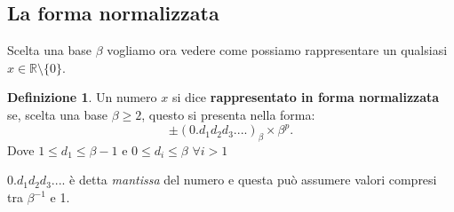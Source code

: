 \documentclass[12pt, a4paper]{book}
\theoremstyle{definition}
\newtheorem{defn}{Definizione}[section]
\begin{document}
\subsection{La forma normalizzata}
\begin{flushleft}
Scelta una base $\beta$ vogliamo ora vedere come possiamo rappresentare un qualsiasi $x \in \mathbb{R}  \setminus \{ 0 \}$.

\begin{defn}
Un numero $x$ si dice \textbf{rappresentato in forma normalizzata} se,  scelta una base $\beta \geq 2$,  questo si presenta nella forma: 
\[ \pm (0.d_{1}d_{2}d_{3}....)_{\beta} \times \beta^{p}. \]
Dove $ 1 \leq d_{1} \leq \beta - 1 $ e $ 0 \leq d_{i} \leq \beta $ $\forall i > 1$
\end{defn}
$0.d_{1}d_{2}d_{3}....$ è detta \textit{mantissa} del numero e questa può assumere valori compresi tra $\beta^{-1}$ e 1.
\end{flushleft}
\end{document}
